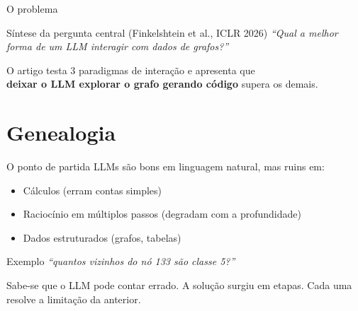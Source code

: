 \documentclass{beamer}
\begin{document}
\begin{frame}{O problema}

  \vspace{2em}
  \begin{block}{Síntese da pergunta central (Finkelshtein et al., ICLR 2026)}
    \emph{``Qual a melhor forma de um LLM interagir com dados de grafos?''}
  \end{block}

  \vspace{1.5em}
  \begin{center}
    \small
    O artigo testa 3 paradigmas de interação e apresenta que\\
    \textbf{deixar o LLM explorar o grafo gerando código} supera os demais.
  \end{center}
\end{frame}
\section{Genealogia}
\begin{frame}{O ponto de partida}
  LLMs são bons em linguagem natural, mas ruins em:
  \begin{itemize}
    \item Cálculos (erram contas simples)
    \item Raciocínio em múltiplos passos (degradam com a profundidade)
    \item Dados estruturados (grafos, tabelas)
  \end{itemize}

 \vspace{2em}
  \begin{block}{Exemplo}
    \emph{``quantos vizinhos do nó 133 são classe 5?''}
  \end{block}

  \vspace{0.5em}
  Sabe-se que o LLM pode contar errado.
  A solução surgiu em etapas. Cada uma resolve a limitação da anterior.
\end{frame}
\end{document}
